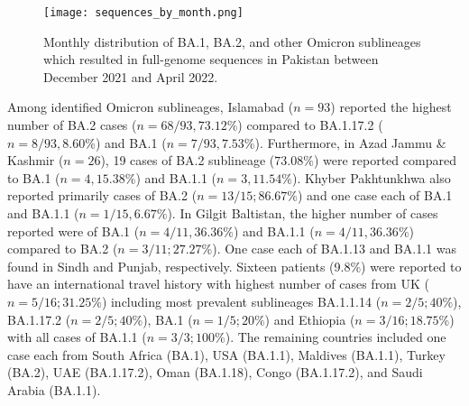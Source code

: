 \begin{figure}[ht]
   \centering
   \texttt{[image: sequences\_by\_month.png]}
    \caption[Omicron lineage distribution]{Monthly distribution of BA.1, BA.2, and other Omicron sublineages which resulted in full-genome sequences in Pakistan between December 2021 and April 2022.}
    \label{fig:sublineages}
\end{figure}


Among identified Omicron sublineages, Islamabad ($n=93$) reported the highest number of BA.2 cases ($n=68/93, 73.12\%$) compared to BA.1.17.2 ($n=8/93, 8.60\%$) and BA.1 ($n=7/93, 7.53\%$).
Furthermore, in Azad Jammu \& Kashmir ($n=26$), 19 cases of BA.2 sublineage ($73.08\%$) were reported compared to BA.1 ($n=4, 15.38\%$) and BA.1.1 ($n=3, 11.54\%$).
Khyber Pakhtunkhwa also reported primarily cases of BA.2 ($n=13/15; 86.67\%$) and one case each of BA.1 and BA.1.1 ($n=1/15, 6.67\%$).
In Gilgit Baltistan, the higher number of cases reported were of BA.1 ($n=4/11, 36.36\%$) and BA.1.1 ($n=4/11, 36.36\%$) compared to BA.2 ($n=3/11; 27.27\%$).
One case each of BA.1.13 and BA.1.1 was found in Sindh and Punjab, respectively.
Sixteen patients (9.8\%) were reported to have an international travel history with highest number of cases from UK ($n=5/16; 31.25\%$) including most prevalent sublineages BA.1.1.14 ($n=2/5; 40\%$), BA.1.17.2 ($n=2/5; 40\%$), BA.1 ($n=1/5; 20\%$) and Ethiopia ($n=3/16; 18.75\%$) with all cases of BA.1.1 ($n=3/3; 100\%$).
The remaining countries included one case each from South Africa (BA.1), USA (BA.1.1), Maldives (BA.1.1), Turkey (BA.2), UAE (BA.1.17.2), Oman (BA.1.18), Congo (BA.1.17.2), and Saudi Arabia (BA.1.1).

